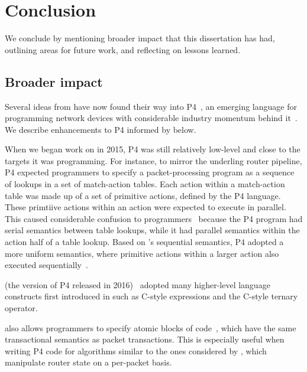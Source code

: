 \chapter{Conclusion}
\label{chap:concl}

We conclude by mentioning broader impact that this dissertation has had,
outlining areas for future work, and reflecting on lessons learned.

\section{Broader impact}
\label{s:impact}
Several ideas from \pktlanguage have now found their way into P4~\cite{p4}, an
emerging language for programming network devices with considerable industry
momentum behind it~\cite{p4org}. We describe enhancements to P4 informed by
\pktlanguage below.
\begin{CompactEnumerate}
\item When we began work on \pktlanguage in 2015, P4 was still relatively
low-level and close to the targets it was programming. For instance, to mirror
the underling router pipeline, P4 expected programmers to specify a
packet-processing program as a sequence of lookups in a set of match-action
tables. Each action within a match-action table was made up of a set of
primitive actions, defined by the P4 language. These primtiive actions within
an action were expected to execute in parallel. This caused considerable
confusion to programmers~\cite{p4-semantics} because the P4 program had serial semantics between
table lookups, while it had parallel semantics within the action half of a
table lookup. Based on \pktlanguage's sequential semantics, P4 adopted a more
uniform semantics, where primitive actions within a larger action also executed
sequentially~\cite{p4_sequential_pr, p4_sequential_issue}.
\item \pfs (the version of P4 released in 2016)~\cite{p4_16} adopted many
higher-level language constructs first introduced in \pktlanguage such as C-style
expressions and the C-style ternary operator.
\item \pfs also allows programmers to specify atomic blocks of code~\cite{p4_atomic_pr, p4_atomic_issue}, which
have the same transactional semantics as packet transactions. This is
especially useful when writing P4 code for algorithms similar to the ones
considered by \pktlanguage, which manipulate router state on a per-packet
basis.
\end{CompactEnumerate}

